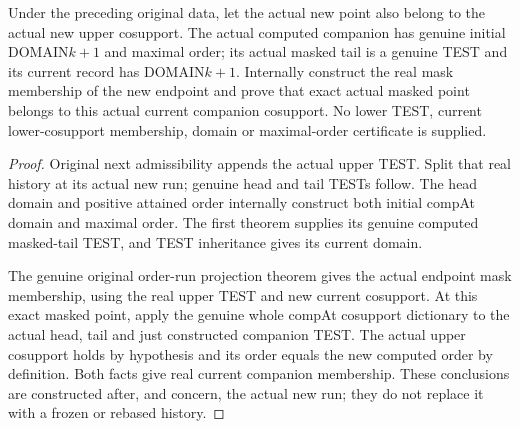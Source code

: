 \begin{theorem}
\label{hir:original-full-cut-current-computed-companion-data}
\leanok
Under the preceding original data, let the actual new point also belong to
the actual new upper cosupport. The actual computed companion has genuine
initial DOMAIN$k+1$ and maximal order; its actual masked tail is a genuine
TEST and its current record has DOMAIN$k+1$. Internally construct the real
mask membership of the new endpoint and prove that exact actual masked
point belongs to this actual current companion cosupport. No lower TEST,
current lower-cosupport membership, domain or maximal-order certificate is
supplied.
\end{theorem}
\begin{proof}
Original next admissibility appends the actual upper TEST. Split that real
history at its actual new run; genuine head and tail TESTs follow. The head
domain and positive attained order internally construct both initial
compAt domain and maximal order. The first theorem supplies its genuine
computed masked-tail TEST, and TEST inheritance gives its current domain.

The genuine original order-run projection theorem gives the actual endpoint
mask membership, using the real upper TEST and new current cosupport.
At this exact masked point, apply the genuine whole compAt cosupport
dictionary to the actual head, tail and just constructed companion TEST.
The actual upper cosupport holds by hypothesis and its order equals the
new computed order by definition. Both facts give real current companion
membership. These conclusions are constructed after, and concern, the
actual new run; they do not replace it with a frozen or rebased history.
\end{proof}

